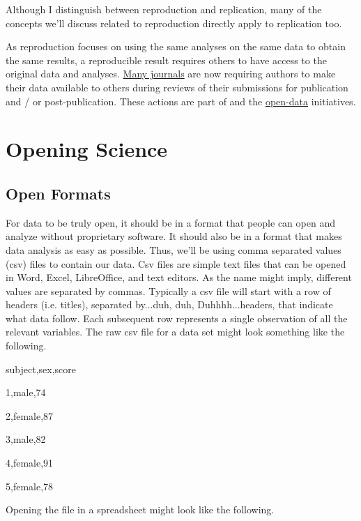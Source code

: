 \documentclass[12pt]{article}
\begin{document}
Although I distinguish between reproduction and replication, many of the concepts we'll discuss related
to reproduction directly apply to replication too.

As reproduction focuses on using the same analyses on the same data to obtain the same results, a
reproducible result requires others to have access to the original data and analyses. 
\href{https://www.fosteropenscience.eu/taxonomy/term/114}{Many journals}
are now requiring authors to make their data available to others during reviews of their submissions
for publication and / or post-publication. These actions are part of and the
\href{http://en.wikipedia.org/wiki/Open_data}{open-data} initiatives.

\section{Opening Science}
\subsection{Open Formats}
For data to be truly open, it should be in a format that people can open and analyze without proprietary
software. It should also be in a format that makes data analysis as easy as possible. Thus, we'll be
using comma separated values (csv) files to contain our data. Csv files are simple text files that can
be opened in Word, Excel, LibreOffice, and text editors. As the name might imply, different values are
separated by commas. Typically a csv file will start with a row of headers (i.e. titles), separated by...duh, duh, Duhhhh...headers, that indicate what data
follow. Each subsequent row represents a single observation of all the relevant variables. The raw csv file for a data set might look something like the following.

\begin{changemargin}{0cm}{.5cm}
subject,sex,score

1,male,74

2,female,87

3,male,82

4,female,91

5,female,78

\end{changemargin}

Opening the file in a spreadsheet might look like the following.
\end{document}
